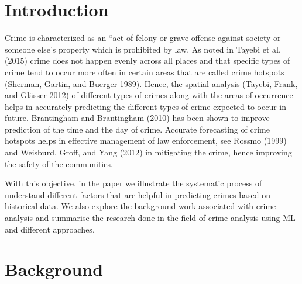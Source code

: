 \documentclass[conference,final,]{IEEEtran}
\begin{document}
\maketitle


%
\IEEEpeerreviewmaketitle


\section{Introduction}\label{introduction}

Crime is characterized as an ``act of felony or grave offense against
society or someone else's property which is prohibited by law. As noted
in Tayebi et al. (2015) crime does not happen evenly across all places
and that specific types of crime tend to occur more often in certain
areas that are called crime hotspots (Sherman, Gartin, and Buerger
1989). Hence, the spatial analysis (Tayebi, Frank, and Glässer 2012) of
different types of crimes along with the areas of occurrence helps in
accurately predicting the different types of crime expected to occur in
future. Brantingham and Brantingham (2010) has been shown to improve
prediction of the time and the day of crime. Accurate forecasting of
crime hotspots helps in effective management of law enforcement, see
Rossmo (1999) and Weisburd, Groff, and Yang (2012) in mitigating the
crime, hence improving the safety of the communities.

With this objective, in the paper we illustrate the systematic process
of understand different factors that are helpful in predicting crimes
based on historical data. We also explore the background work associated
with crime analysis and summarise the research done in the field of
crime analysis using ML and different approaches.

\section{Background}\label{background}
\end{document}
